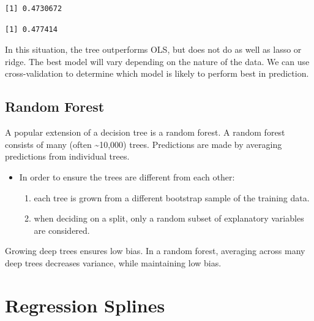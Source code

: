 \documentclass[
  letterpaper,
  DIV=11,
  numbers=noendperiod]{scrreprt}
\newenvironment{Shaded}{\begin{snugshade}}{\end{snugshade}}
\newcommand{\FunctionTok}[1]{\textcolor[rgb]{0.28,0.35,0.67}{#1}}
\newcommand{\NormalTok}[1]{\textcolor[rgb]{0.00,0.23,0.31}{#1}}
\newcommand{\SpecialCharTok}[1]{\textcolor[rgb]{0.37,0.37,0.37}{#1}}
\providecommand{\tightlist}{%
  \setlength{\itemsep}{0pt}\setlength{\parskip}{0pt}}\usepackage{longtable,booktabs,array}
\begin{document}
\begin{verbatim}
[1] 0.4730672
\end{verbatim}

\begin{Shaded}
\end{Shaded}

\begin{verbatim}
[1] 0.477414
\end{verbatim}

In this situation, the tree outperforms OLS, but does not do as well as
lasso or ridge. The best model will vary depending on the nature of the
data. We can use cross-validation to determine which model is likely to
perform best in prediction.

\subsection{Random Forest}\label{random-forest}

A popular extension of a decision tree is a random forest. A random
forest consists of many (often \textasciitilde10,000) trees. Predictions
are made by averaging predictions from individual trees.

\begin{itemize}
\tightlist
\item
  In order to ensure the trees are different from each other:

  \begin{enumerate}
  \def\labelenumi{\arabic{enumi}.}
  \tightlist
  \item
    each tree is grown from a different bootstrap sample of the training
    data.\\
  \item
    when deciding on a split, only a random subset of explanatory
    variables are considered.
  \end{enumerate}
\end{itemize}

Growing deep trees ensures low bias. In a random forest, averaging
across many deep trees decreases variance, while maintaining low bias.

\section{Regression Splines}\label{regression-splines}
\end{document}
